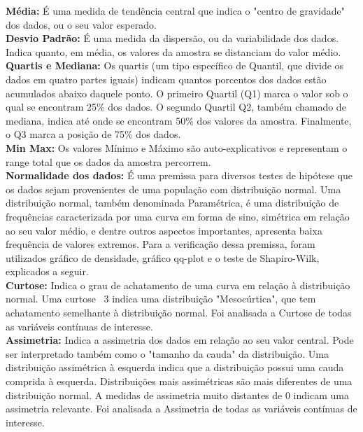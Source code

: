 \documentclass[a4paper, 12pt]{article} %
\begin{document}
\textbf{Média:} É uma medida de tendência central que indica o "centro de gravidade" dos dados, ou o seu valor esperado.\\

\textbf{Desvio Padrão:} É uma medida da dispersão, ou da variabilidade dos dados. Indica quanto, em média, os valores da amostra se distanciam do valor médio.\\

\textbf{Quartis e Mediana:} Os quartis (um tipo específico de Quantil, que divide os dados em quatro partes iguais) indicam quantos porcentos dos dados estão acumulados abaixo daquele ponto. O primeiro Quartil (Q1) marca o valor sob o qual se encontram 25\% dos dados. O segundo Quartil Q2, também chamado de mediana, indica até onde se encontram 50\% dos valores da amostra. Finalmente, o Q3 marca a posição de 75\% dos dados.\\

\textbf{Min Max:} Os valores Mínimo e Máximo são auto-explicativos e representam o range total que os dados da amostra percorrem.\\

\textbf{Normalidade dos dados:} É uma premissa para diversos testes de hipótese que os dados sejam provenientes de uma população com distribuição normal. Uma distribuição normal, também denominada Paramétrica, é uma distribuição de frequências caracterizada por uma curva em forma de sino, simétrica em relação ao seu valor médio, e dentre outros aspectos importantes, apresenta baixa frequência de valores extremos. Para a verificação dessa premissa, foram utilizados gráfico de densidade, gráfico qq-plot e o teste de Shapiro-Wilk, explicados a seguir.  \\

\textbf{Curtose:} Indica o grau de achatamento de uma curva em relação à distribuição normal. Uma curtose ~3 indica uma distribuição "Mesocúrtica", que tem achatamento semelhante à distribuição normal. Foi analisada a Curtose de todas as variáveis contínuas de interesse.\\

\textbf{Assimetria:} Indica a assimetria dos dados em relação ao seu valor central. Pode ser interpretado também como o "tamanho da cauda"  da distribuição. Uma distribuição assimétrica à esquerda indica que a distribuição possui uma cauda comprida à esquerda. Distribuições mais assimétricas são mais diferentes de uma distribuição normal. A medidas de assimetria muito distantes de 0 indicam uma assimetria relevante. Foi analisada a Assimetria de todas as variáveis contínuas de interesse.\\
\end{document}
